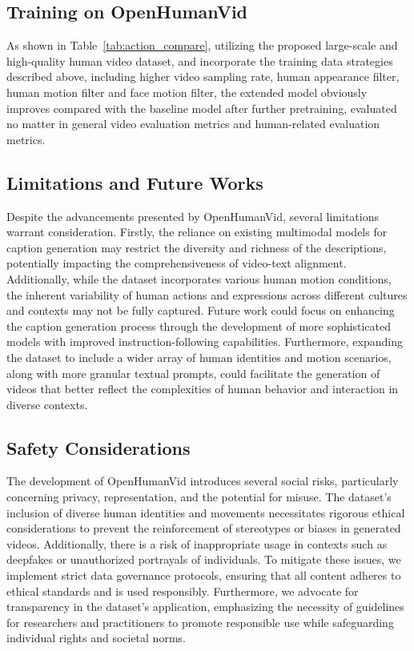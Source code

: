 \subsection{Training on OpenHumanVid} 
As shown in Table~\ref{tab:action_compare}, utilizing the proposed large-scale and high-quality human video dataset, and incorporate the training data strategies described above, including higher video sampling rate, human appearance filter, human motion filter and face motion filter, the extended model obviously improves compared with the baseline model after further pretraining, evaluated no matter in general video evaluation metrics and human-related evaluation metrics.


\subsection{Limitations and Future Works}
Despite the advancements presented by OpenHumanVid, several limitations warrant consideration. 
Firstly, the reliance on existing multimodal models for caption generation may restrict the diversity and richness of the descriptions, potentially impacting the comprehensiveness of video-text alignment. 
Additionally, while the dataset incorporates various human motion conditions, the inherent variability of human actions and expressions across different cultures and contexts may not be fully captured. 
Future work could focus on enhancing the caption generation process through the development of more sophisticated models with improved instruction-following capabilities. 
Furthermore, expanding the dataset to include a wider array of human identities and motion scenarios, along with more granular textual prompts, could facilitate the generation of videos that better reflect the complexities of human behavior and interaction in diverse contexts.

\subsection{Safety Considerations}
The development of OpenHumanVid introduces several social risks, particularly concerning privacy, representation, and the potential for misuse. The dataset's inclusion of diverse human identities and movements necessitates rigorous ethical considerations to prevent the reinforcement of stereotypes or biases in generated videos. Additionally, there is a risk of inappropriate usage in contexts such as deepfakes or unauthorized portrayals of individuals. To mitigate these issues, we implement strict data governance protocols, ensuring that all content adheres to ethical standards and is used responsibly. Furthermore, we advocate for transparency in the dataset's application, emphasizing the necessity of guidelines for researchers and practitioners to promote responsible use while safeguarding individual rights and societal norms.

